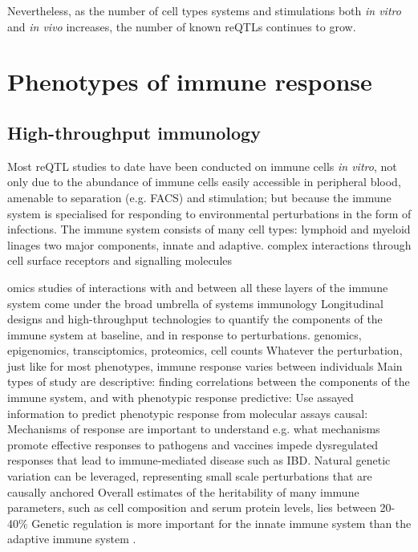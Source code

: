 \begin{outline}
    \2 Nevertheless, as the number of cell types systems and stimulations both \textit{in vitro} and \textit{in vivo} increases, the number of known reQTLs continues to grow.

\section{Phenotypes of immune response}

\subsection{High-throughput immunology}
\1 Most \gls{reQTL} studies to date have been conducted on immune cells \textit{in vitro}, 
not only due to the abundance of immune cells easily accessible in peripheral blood, amenable to separation (e.g. FACS) and stimulation;
but because the immune system is specialised for responding to environmental perturbations in the form of infections.
    \2 The immune system consists of many cell types: lymphoid and myeloid linages
    \2 two major components, innate and adaptive.
    \2 complex interactions through cell surface receptors and signalling molecules

\1 omics studies of interactions with and between all these layers of the immune system come under the broad umbrella of systems immunology
    \2 Longitudinal designs and high-throughput technologies to quantify the components of the immune system at baseline, and in response to perturbations.
        \3 genomics, epigenomics, transciptomics, proteomics, cell counts
    \2 Whatever the perturbation, just like for most phenotypes, immune response varies between individuals
    \2 Main types of study are descriptive:
        \3 finding correlations between the components of the immune system, and with phenotypic response
    \2 predictive:
        \3 Use assayed information to predict phenotypic response from molecular assays
    \2 causal:
        \3 Mechanisms of response are important to understand e.g. 
            \4 what mechanisms promote effective responses to pathogens and vaccines
            \4 impede dysregulated responses that lead to immune-mediated disease such as IBD.
    \2 Natural genetic variation can be leveraged, representing small scale perturbations that are causally anchored \autocite{tsang2015UtilizingPopulationVariation,villani2018SystemsImmunologyLearning}
        \3 Overall estimates of the heritability of many immune parameters, such as cell composition and serum protein levels, lies between 20-40\% \autocite{liston2016ShapingVariationHuman,brodin2017HumanImmuneSystem,patin2018NaturalVariationParameters,liston2018OriginsDiversityHuman}
        \3 Genetic regulation is more important for the innate immune system than the adaptive immune system \autocite{patin2018NaturalVariationParameters}.


\end{outline}
